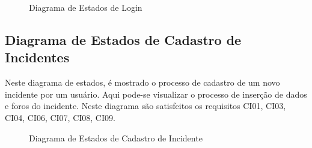 \documentclass[12pt]{article}
\begin{document}
  \begin{figure}[!htb]
    \caption{\label{fig:diagEstadoLogin} Diagrama de Estados de Login}
  \end{figure}

\vfill%
\pagebreak%

\subsection{Diagrama de Estados de Cadastro de Incidentes}

Neste diagrama de estados, é mostrado o processo de cadastro de um novo incidente por um usuário. Aqui pode-se visualizar o processo de inserção de dados e foros do incidente. Neste diagrama são satisfeitos os requisitos CI01, CI03, CI04, CI06, CI07, CI08, CI09.

  \begin{figure}[!htb]
    \caption{\label{fig:diagEstadoCadastroIncidente} Diagrama de Estados de Cadastro de Incidente}
  \end{figure}
\end{document}
